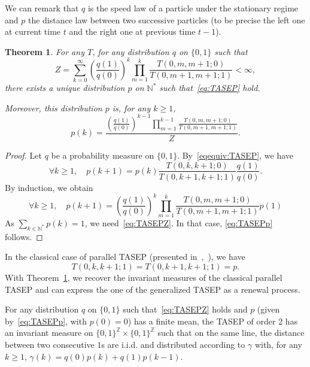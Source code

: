 \documentclass[10pt]{amsart}
\newtheorem{theo}{Theorem}[section]
\theoremstyle{definition}\newtheorem{defi}[theo]{Definition}\newtheorem{rema}[theo]{Remark}\newtheorem{exam}[theo]{Example}\newtheorem{exem}[theo]{Example}\newtheorem{nota}[theo]{Notation}
\newcounter{a}
\newcommand{\NN}{\mathbb{N}}
\newcommand{\ZZ}{\mathbb{Z}}
\let\oldforall\forall
\renewcommand*{\forall}{\mathrel{\oldforall}}
\begin{document}
We can remark that $q$ is the speed law of a particle under the stationary regime and $p$ the distance law between two successive particles (to be precise the left one at current time $t$ and the right one at previous time $t-1$).



\begin{theo}\label{theo:TASEP}
For any $T$, for any distribution $q$ on $\{0,1\}$ such that
\begin{equation}\label{eq:TASEPZ}
Z = \sum_{k=0}^\infty \left(\frac{q(1)}{q(0)}\right)^k \prod_{m=1}^k \frac{T(0,m,m+1;0)}{T(0,m+1,m+1;1)} < \infty,
\end{equation}
there exists a unique distribution $p$ on $\NN^*$ such that~\eqref{eq:TASEP} hold.

Moreover, this distribution $p$ is, for any $k \geq 1$,
\begin{equation}\label{eq:TASEPp}
p(k) = \frac{\displaystyle \left(\frac{q(1)}{q(0)}\right)^{k-1} \prod_{m=1}^{k-1} \frac{T(0,m,m+1;0)}{T(0,m+1,m+1;1)}}{Z}.
\end{equation}
\end{theo}

\begin{proof}
Let $q$ be a probability measure on $\{0,1\}$. By~\eqref{eqequiv:TASEP}, we have
\begin{equation}\label{eq:TASEPind}
\forall k\geq 1, \quad p(k+1) = p(k) \frac{T(0,k,k+1;0)}{T(0,k+1,k+1;1)} \frac{q(1)}{q(0)}.
\end{equation}
By induction, we obtain
\begin{equation*}
\forall k\geq 1, \quad p(k+1)=\left(\frac{q(1)}{q(0)}\right)^k \prod_{m=1}^k \frac{T(0,m,m+1;0)}{T(0,m+1,m+1;1)} p(1)
\end{equation*}
As $\sum_{k\in\NN^*} p(k) = 1$, we need~\eqref{eq:TASEPZ}. In that case, \eqref{eq:TASEPp} follows.
\end{proof}

In the classical case of parallel TASEP (presented in~\cite[Sections~2.3 \& 4.3]{mm_tcs},~\cite[Section~3.3]{Casse16}), we have
\begin{equation}\label{eq:classTASEP}
T(0,k,k+1;1) = T(0,k+1,k+1;1) = p.
\end{equation}
With Theorem~\ref{theo:TASEP}, we recover the invariant measures of the classical parallel TASEP and can express the one of the generalized TASEP as a renewal process.


\begin{coro}
For any distribution $q$ on $\{0,1\}$ such that~\eqref{eq:TASEPZ} holds and $p$ (given by~\eqref{eq:TASEPp}, with $p(0)=0$) has a finite mean, the TASEP of order 2 has an invariant measure on $\{0,1\}^\ZZ \times \{0,1\}^\ZZ$ such that on the same line, the distance between two consecutive $1$s are i.i.d. and distributed according to $\gamma$ with, for any $k \geq 1$, $\gamma(k) = q(0) p(k) + q(1)p(k-1)$.
\end{coro}
\end{document}
